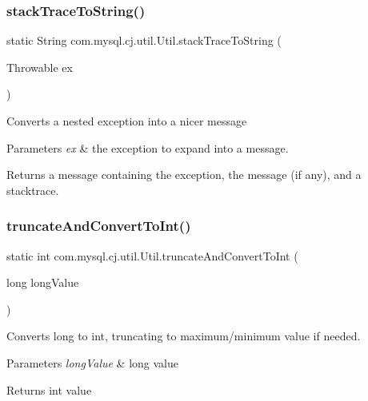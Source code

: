 \subsubsection{\texorpdfstring{stack\+Trace\+To\+String()}{stackTraceToString()}}
{\footnotesize\ttfamily static String com.\+mysql.\+cj.\+util.\+Util.\+stack\+Trace\+To\+String (\begin{DoxyParamCaption}\item[{Throwable}]{ex }\end{DoxyParamCaption})\hspace{0.3cm}{\ttfamily [static]}}

Converts a nested exception into a nicer message


\begin{DoxyParams}{Parameters}
{\em ex} & the exception to expand into a message.\\
\hline
\end{DoxyParams}
\begin{DoxyReturn}{Returns}
a message containing the exception, the message (if any), and a stacktrace. 
\end{DoxyReturn}
\mbox{\label{classcom_1_1mysql_1_1cj_1_1util_1_1_util_a2f847b31da7b0217bf7c9dbbba3324db}} 
\subsubsection{\texorpdfstring{truncate\+And\+Convert\+To\+Int()}{truncateAndConvertToInt()}\hspace{0.1cm}{\footnotesize\ttfamily [1/2]}}
{\footnotesize\ttfamily static int com.\+mysql.\+cj.\+util.\+Util.\+truncate\+And\+Convert\+To\+Int (\begin{DoxyParamCaption}\item[{long}]{long\+Value }\end{DoxyParamCaption})\hspace{0.3cm}{\ttfamily [static]}}

Converts long to int, truncating to maximum/minimum value if needed.


\begin{DoxyParams}{Parameters}
{\em long\+Value} & long value \\
\hline
\end{DoxyParams}
\begin{DoxyReturn}{Returns}
int value 
\end{DoxyReturn}
\mbox{\label{classcom_1_1mysql_1_1cj_1_1util_1_1_util_a73b0a7029da0c63b85399eeee5d36527}} 
